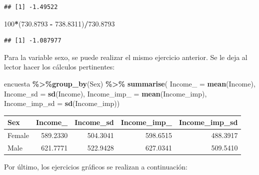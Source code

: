 \documentclass[
  12pt,
]{book}
\newenvironment{Shaded}{\begin{snugshade}}{\end{snugshade}}
\newcommand{\AttributeTok}[1]{\textcolor[rgb]{0.13,0.29,0.53}{#1}}
\newcommand{\DecValTok}[1]{\textcolor[rgb]{0.00,0.00,0.81}{#1}}
\newcommand{\FloatTok}[1]{\textcolor[rgb]{0.00,0.00,0.81}{#1}}
\newcommand{\FunctionTok}[1]{\textcolor[rgb]{0.13,0.29,0.53}{\textbf{#1}}}
\newcommand{\NormalTok}[1]{#1}
\newcommand{\SpecialCharTok}[1]{\textcolor[rgb]{0.81,0.36,0.00}{\textbf{#1}}}
\begin{document}
\begin{verbatim}
## [1] -1.49522
\end{verbatim}

\begin{Shaded}
\begin{Highlighting}[]
\DecValTok{100}\SpecialCharTok{*}\NormalTok{(}\FloatTok{730.8793} \SpecialCharTok{{-}} \FloatTok{738.8311}\NormalTok{)}\SpecialCharTok{/}\FloatTok{730.8793}
\end{Highlighting}
\end{Shaded}

\begin{verbatim}
## [1] -1.087977
\end{verbatim}

Para la variable sexo, se puede realizar el mismo ejercicio anterior. Se le deja al lector hacer los cálculos pertinentes:

\begin{Shaded}
\begin{Highlighting}[]
\NormalTok{encuesta }\SpecialCharTok{\%\textgreater{}\%}\FunctionTok{group\_by}\NormalTok{(Sex) }\SpecialCharTok{\%\textgreater{}\%}  \FunctionTok{summarise}\NormalTok{(}
  \AttributeTok{Income\_ =} \FunctionTok{mean}\NormalTok{(Income),}
  \AttributeTok{Income\_sd =} \FunctionTok{sd}\NormalTok{(Income),}
  \AttributeTok{Income\_imp\_ =} \FunctionTok{mean}\NormalTok{(Income\_imp),}
  \AttributeTok{Income\_imp\_sd =} \FunctionTok{sd}\NormalTok{(Income\_imp))}
\end{Highlighting}
\end{Shaded}

\begin{tabular}{l|r|r|r|r}
\hline
Sex & Income\_ & Income\_sd & Income\_imp\_ & Income\_imp\_sd\\
\hline
Female & 589.2330 & 504.3041 & 598.6515 & 488.3917\\
\hline
Male & 621.7771 & 522.9428 & 627.0341 & 509.5410\\
\hline
\end{tabular}

Por último, los ejercicios gráficos se realizan a continuación:
\end{document}
